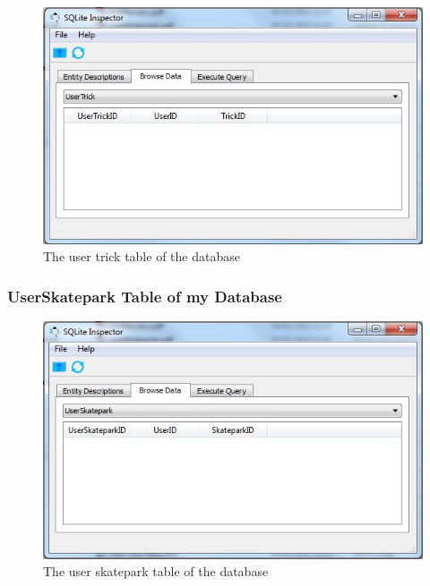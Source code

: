 \begin{figure}[H]
    \includegraphics[width=\textwidth]{./Maintenance/Figures/UserTrickTable.jpg}
    \caption{The user trick table of the database} \label{fig:UserTrick Table}
\end{figure}


\subsubsection{UserSkatepark Table of my Database}
\begin{figure}[H]
    \includegraphics[width=\textwidth]{./Maintenance/Figures/UserSkateparkTable.jpg}
    \caption{The user skatepark table of the database} \label{fig:UserSkatepark Table}
\end{figure}


